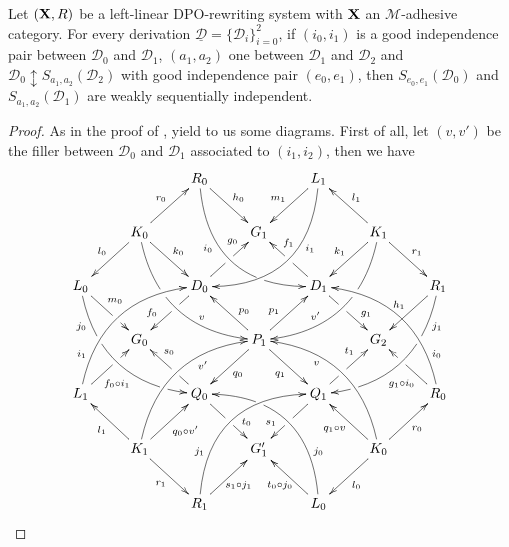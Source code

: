 \documentclass[a4paper,UKenglish,cleveref,pdftex, thm-restate,numberwithinsect]{lipics}
\def\R{\mathsf{R}}
\def\X{\textbf {\textup{X}}}
\newcommand{\dder}[1]{\mathscr{#1}}
\newcommand{\der}[1]{\underline{\dder{#1}}}
\begin{document}
 

\begin{lemma}\label{lem:iig2}Let $(\X,\R)$ be a left-linear DPO-rewriting system with $\X$ an $\mathcal{M}$-adhesive category. For every derivation $\der{D}=\{\dder{D}_i\}_{i=0}^2$, if $(i_0,i_1)$ is a good independence pair between $\dder{D}_0$ and $\dder{D}_1$, $(a_1,a_2)$ one between $\dder{D}_1$ and $\dder{D}_2$ and $\dder{D}_0\updownarrow S_{a_1,a_2}(\dder{D}_2)$ with good independence pair $(e_0,e_1)$, then $S_{e_0,e_1}(\dder{D}_0)$ and $S_{a_1,a_2}(\dder{D}_1)$ are weakly sequentially independent.
\end{lemma}
\begin{proof} As in the proof of ,  yield to us some diagrams.  First of all, let $(v,v')$ be the filler between $\dder{D}_0$ and $\dder{D}_1$ associated to $(i_1, i_2)$, then we have
	\[\xymatrix{&&R_0 \ar@/_1cm/[ddrr]_(.35){i_0}|(.7)\hole \ar[dr]^{h_0}&& L_1\ar@/^1cm/[ddll]^(.35){i_1}  \ar[dl]_{m_1}\\&K_0\ar[dr]^{k_0}\ar[dl]_{l_0} \ar@/_.8cm/[ddrr]|(.36)\hole^(.65){v}\ar[ur]^{r_0}&& G_1 && K_1 \ar@/^.8cm/[ddll]|(.36)\hole_(.65){v'}\ar[dl]_{k_1}\ar[lu]_{l_1} \ar[dr]^{r_1}\\L_0 \ar@/_.8cm/[ddrr]_(.2){j_0}|(.31)\hole|(.81)\hole \ar[dr]^(.4){m_0}|(.61)\hole && D_0 \ar[dl]|(.4)\hole_(.65){f_0}\ar[ur]|(.5)\hole^(.7){g_0}&&D_1 \ar[dr]|(.4)\hole^(.65){g_1} \ar[ul]|(.5)\hole_(.65){f_1}&&R_1\ar@/^.8cm/[ddll]^(.2){j_1}|(.31)\hole|(.81)\hole\ar[dl]_{h_1}\\&G_0 &&P_1\ar[dr]_{q_1} \ar[dl]^{q_0}\ar[ur]^(.4){p_1}\ar[ul]_(.4){p_0}&&G_2\\L_1 \ar@/^.8cm/[uurr]^(.2){i_1} \ar[ur]_(.35){f_0\circ i_1}|(.61)\hole&&Q_0 \ar[ul]|(.4)\hole_(.65){s_0}\ar[dr]|(.5)\hole^(.65){t_0} &&Q_1\ar[ur]|(.4)\hole^(.65){t_1} \ar[dl]|(.5)\hole_(.65){s_1} && R_0  \ar[ul]^(.35){g_1\circ i_0}|(.61)\hole\ar@/_.8cm/[uull]_(.2){i_0}\\&K_1 \ar[ur]_{q_0\circ v'} \ar[dr]_{r_1} \ar[ul]^{l_1}\ar@/^.8cm/[uurr]_(.65){v'}&&G'_1&& K_0 \ar[ur]_{r_0} \ar[ul]^{q_1\circ v} \ar[dl]^{l_0} \ar@/_.8cm/[uull]^(.65){v}\\&& R_1 \ar[ur]_{\hspace{-5pt}s_1\circ j_1}\ar@/^1cm/[uurr]^(.25){j_1}&& L_0 \ar[ul]^{t_0\circ j_0\hspace{-5pt}} \ar@/_1cm/[uull]_(.25){j_0} |(.69)\hole }\]
	

\end{proof}
\end{document}
